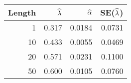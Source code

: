 \begin{table}[ht]
\centering
\begin{tabular}{rrrr}
  \hline
Length & $\widehat{\lambda}$ & $\widehat{\alpha}$ & SE($\widehat{\lambda}$) \\ 
  \hline
1 & 0.317 & 0.0184 & 0.0731 \\ 
  10 & 0.433 & 0.0055 & 0.0469 \\ 
  20 & 0.571 & 0.0231 & 0.1100 \\ 
  50 & 0.600 & 0.0105 & 0.0760 \\ 
   \hline
\end{tabular}
\end{table}
